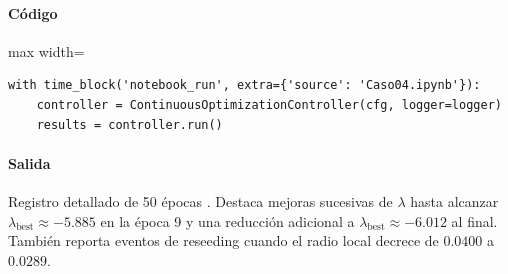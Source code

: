 \paragraph{Código}
\begin{listing}[H]
\caption{Celda 19: corrida principal del optimizador}
\label{lst:c04_cell19}
\begin{adjustbox}{max width=\textwidth}
\begin{minipage}{\textwidth}
\begin{verbatim}
with time_block('notebook_run', extra={'source': 'Caso04.ipynb'}):
    controller = ContinuousOptimizationController(cfg, logger=logger)
    results = controller.run()
\end{verbatim}
\end{minipage}
\end{adjustbox}
\end{listing}
\paragraph{Salida} Registro detallado de 50 épocas . Destaca mejoras sucesivas de $\lambda$ hasta alcanzar $\lambda_{\text{best}} \approx -5.885$ en la época 9 y una reducción adicional a $\lambda_{\text{best}} \approx -6.012$ al final. También reporta eventos de reseeding cuando el radio local decrece de $0.0400$ a $0.0289$.

